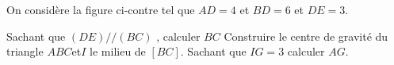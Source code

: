 \documentclass[a4paper,addpoints,12pt]{exam}
\begin{document}
\begin{exo}
\begin{minipage}{0.6\linewidth}

On considère la figure ci-contre tel que $AD=4$ et $BD=6$ et $DE=3$. 
\begin{questions}
\question Sachant que $(DE)//(BC)$ , calculer $BC$
\question Construire le centre de gravité du triangle $ABC$et$I$ le milieu de $[BC]$.
\question Sachant que  $IG=3$ calculer $AG$.
\end{questions}
\end{minipage}
\begin{minipage}{0.4\linewidth}
\end{minipage}
\end{exo}
\end{document}
